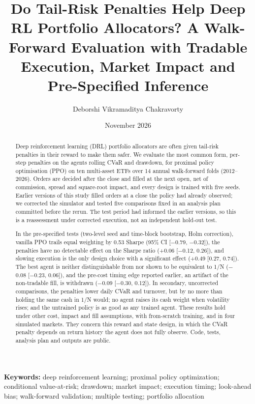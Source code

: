 \documentclass[11pt]{article}
\title{Do Tail-Risk Penalties Help Deep RL Portfolio Allocators? A Walk-Forward Evaluation with Tradable Execution, Market Impact and Pre-Specified Inference}
\author{Deborshi Vikramaditya Chakravorty}
\date{November 2026}
\begin{document}
\maketitle
\begin{abstract}
Deep reinforcement learning (DRL) portfolio allocators are often given tail-risk penalties in their reward to make them safer. We evaluate the most common form, per-step penalties on the agent\textquotesingle s rolling CVaR and drawdown, for proximal policy optimisation (PPO) on ten multi-asset ETFs over 14 annual walk-forward folds (2012--2026). Orders are decided after the close and filled at the next open, net of commission, spread and square-root impact, and every design is trained with five seeds. Earlier versions of this study filled orders at a close the policy had already observed; we corrected the simulator and tested five comparisons fixed in an analysis plan committed before the rerun. The test period had informed the earlier versions, so this is a reassessment under corrected execution, not an independent hold-out test.

In the pre-specified tests (two-level seed and time-block bootstrap, Holm correction), vanilla PPO trails equal weighting by 0.53 Sharpe (95\% CI {[}$-$0.79, $-$0.32{]}), the penalties have no detectable effect on the Sharpe ratio (+0.06 {[}$-$0.12, 0.26{]}), and slowing execution is the only design choice with a significant effect (+0.49 {[}0.27, 0.74{]}). The best agent is neither distinguishable from nor shown to be equivalent to 1/N ($-$0.08 {[}$-$0.23, 0.06{]}), and the pre-cost timing edge reported earlier, an artifact of the non-tradable fill, is withdrawn ($-$0.09 {[}$-$0.30, 0.12{]}). In secondary, uncorrected comparisons, the penalties lower daily CVaR and turnover, but by no more than holding the same cash in 1/N would; no agent raises its cash weight when volatility rises; and the untrained policy is as good as any trained agent. These results hold under other cost, impact and fill assumptions, with from-scratch training, and in four simulated markets. They concern this reward and state design, in which the CVaR penalty depends on return history the agent does not fully observe. Code, tests, analysis plan and outputs are public.
\end{abstract}
\noindent\textbf{Keywords:} deep reinforcement learning; proximal policy optimization; conditional value-at-risk; drawdown; market impact; execution timing; look-ahead bias; walk-forward validation; multiple testing; portfolio allocation
\end{document}
